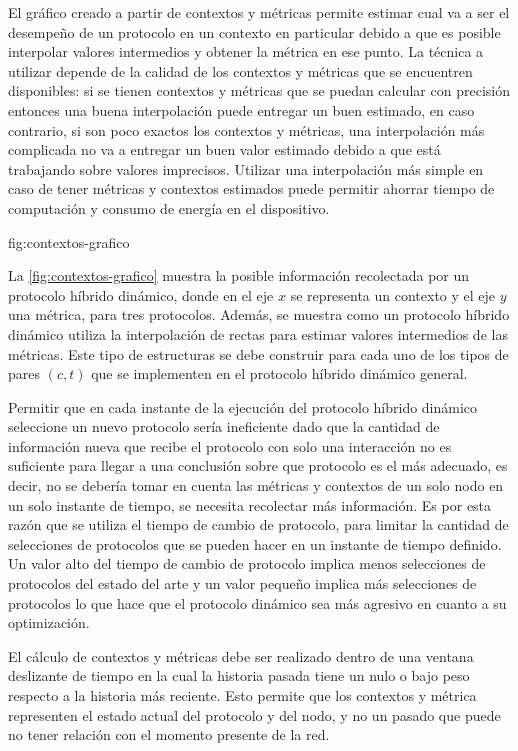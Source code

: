 El gráfico creado a partir de contextos y métricas permite estimar cual va a
ser el desempeño de un protocolo en un contexto en particular debido a que es
posible interpolar valores intermedios y obtener la métrica en ese punto.  La
técnica a utilizar depende de la calidad de los contextos y métricas que se
encuentren disponibles: si se tienen contextos y métricas que se puedan calcular
con precisión entonces una buena interpolación puede entregar un buen estimado,
en caso contrario, si son poco exactos los contextos y métricas, una
interpolación más complicada no va a entregar un buen valor estimado debido a
que está trabajando sobre valores imprecisos. Utilizar una interpolación más
simple en caso de tener métricas y contextos estimados puede permitir ahorrar
tiempo de computación y consumo de energía en el dispositivo.

{}{fig:contextos-grafico}

La \ref{fig:contextos-grafico} muestra la posible información recolectada por un
protocolo híbrido dinámico, donde en el eje $x$ se representa un contexto y el
eje $y$ una métrica, para tres protocolos. Además, se muestra como un protocolo
híbrido dinámico utiliza la interpolación de rectas para estimar valores
intermedios de las métricas. Este tipo de estructuras se debe construir para
cada uno de los tipos de pares $(c, t)$ que se implementen en el protocolo
híbrido dinámico general.

Permitir que en cada instante de la ejecución del protocolo híbrido dinámico 
seleccione un nuevo protocolo sería ineficiente dado que la cantidad de
información nueva que recibe el protocolo con solo una interacción no es
suficiente para llegar a una conclusión sobre que protocolo es el más adecuado,
es decir, no se debería tomar en cuenta las métricas y contextos de un solo nodo
en un solo instante de tiempo, se necesita recolectar más información. Es por
esta razón que se utiliza el tiempo de cambio de protocolo, para limitar la
cantidad de selecciones de protocolos que se pueden hacer en un instante de
tiempo definido. Un valor alto del tiempo de cambio de protocolo implica menos
selecciones de protocolos del estado del arte y un valor pequeño implica más
selecciones de protocolos lo que hace que el protocolo dinámico sea más agresivo
en cuanto a su optimización.
  

El cálculo de contextos y métricas debe ser realizado dentro de una ventana
deslizante de tiempo en la cual la historia pasada tiene un nulo o bajo peso
respecto a la historia más reciente. Esto permite que los contextos y métrica
representen el estado actual del protocolo y del nodo, y no un pasado que puede
no tener relación con el momento presente de la red. 


